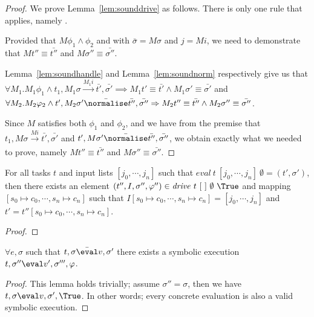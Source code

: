 \begin{proof}
  We prove Lemma~\ref{lem:sounddrive} as follows.
  There is only one rule that applies, namely .

  Provided that $M\phi_1\land\phi_2$ and  with $\bar{\sigma}=M\sigma$ and $j=M i$,
  we need to demonstrate that $M t'' \equiv \bar{t''}$ and $M\sigma''\equiv \bar{\sigma''}$.


  Lemma~\ref{lem:soundhandle} and Lemma~\ref{lem:soundnorm} respectively give us that\\
$\forall M_1 . M_1 \phi_1 \land t_1,M_1\sigma \xrightarrow[]{M_1 i} \bar{t'},\bar{\sigma'}\implies M_1 t'\equiv\bar{t'}\land M_1\sigma' \equiv \bar{\sigma'}$ and \\
$\forall M_2 . M_2 \phi_2 \land t',M_2\sigma' \bar{\normalise} \bar{t''},\bar{\sigma''}\implies M_2 t''\equiv\bar{t''}\land M_2\sigma'' \equiv \bar{\sigma''}$.

Since $M$ satisfies both $\phi_1$ and $\phi_2$, and we have from the premise that
$t_1,M\sigma \xrightarrow[]{M i} \bar{t'},\bar{\sigma'}$ and
$t',M\sigma' \bar{\normalise} \bar{t''},\bar{\sigma''}$,
we obtain exactly what we needed to prove,
namely $M t'' \equiv \bar{t''}$ and $M\sigma''\equiv \bar{\sigma''}$.

\end{proof}




\begin{theorem}
For all tasks $t$ and input lists $[j_0,\cdots,j_n]$ such that $\mathit{eval}\ t\ [j_0,\cdots,j_n]\ \emptyset = (t',\sigma')$,
then there exists an element $(t'',I,\sigma'',\phi'')\in \mathit{drive}\ t\ [\ ]\ \emptyset\ \True$ and mapping $[s_0\mapsto c_0,\cdots,s_n\mapsto c_n]$ such that
$I[s_0\mapsto c_0,\cdots,s_n\mapsto c_n]=[j_0,\cdots,j_n]$ and $t'=t''[s_0\mapsto c_0,\cdots,s_n\mapsto c_n]$.
  \label{thm:complete}
\end{theorem}

\begin{proof}
\end{proof}

\begin{lemma}
  $\forall e,\sigma$ such that $t,\sigma \bar{\eval}v,\sigma'$
  there exists a symbolic execution $t,\sigma''\eval v',\sigma''',\phi$.
\end{lemma}

\begin{proof}
This lemma holds trivially; assume $\sigma''=\sigma$, then we have $t,\sigma\eval v,\sigma',\True$.
In other words; every concrete evaluation is also a valid symbolic execution.
\end{proof}

